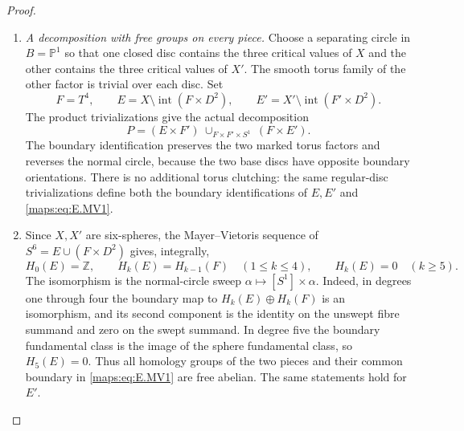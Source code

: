 \begin{proof}
\begin{enumerate}[label=\arabic*.,leftmargin=*]
\item \emph{A decomposition with free groups on every piece.}
Choose a separating circle in $B=\mathbb P^1$ so that one closed
disc contains the three critical values of $X$ and the other
contains the three critical values of $X'$. The smooth torus
family of the other factor is trivial over each disc. Set
\[
 F=T^4,\qquad E=X\setminus\operatorname{int}(F\times D^2),
 \qquad E'=X'\setminus\operatorname{int}(F'\times D^2).
\]
The product trivializations give the actual decomposition
\[
 P=(E\times F')\ \cup_{F\times F'\times S^1}\ (F\times E').
 \tag{E.MV1}\label{maps:eq:E.MV1}
\]
The boundary identification preserves the two marked torus factors
and reverses the normal circle, because the two base discs have
opposite boundary orientations. There is no additional torus
clutching: the same regular-disc trivializations define both the
boundary identifications of $E,E'$ and \eqref{maps:eq:E.MV1}.

\item Since $X,X'$ are six-spheres, the Mayer--Vietoris sequence of
$S^6=E\cup(F\times D^2)$ gives, integrally,
\[
 H_0(E)=\mathbb Z,\qquad H_k(E)=H_{k-1}(F)\quad(1\leq k\leq4),
 \qquad H_k(E)=0\quad(k\geq5).
 \tag{E.MV2}\label{maps:eq:E.MV2}
\]
The isomorphism is the normal-circle sweep
$\alpha\mapsto[S^1]\times\alpha$. Indeed, in degrees one
through four the boundary map to $H_k(E)\oplus H_k(F)$ is
an isomorphism, and its second component is the identity on
the unswept fibre summand and zero on the swept summand.
In degree five the boundary fundamental class is the image
of the sphere fundamental class, so $H_5(E)=0$.
Thus all homology groups of the two pieces and their common
boundary in \eqref{maps:eq:E.MV1} are free abelian. The same statements hold
for $E'$.


\end{enumerate}
\end{proof}
